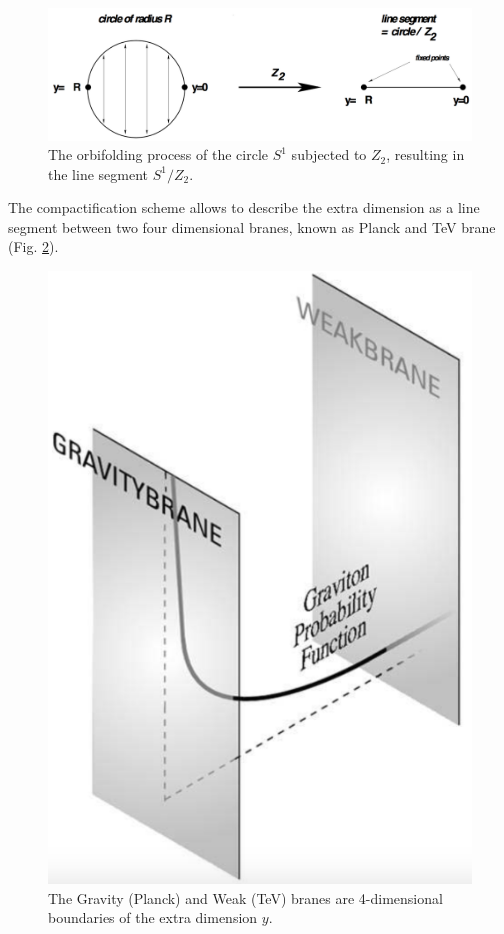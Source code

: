 \begin{figure}[htb!!]
\centering
\includegraphics[scale=0.25]{figures/theory/orbifold.png}
\caption[Orbifold process]{The orbifolding process of the circle $S^1$ subjected to $Z_2$, resulting in the line segment $S^1/Z_2$.}
\label{orbifold}
\end{figure}

The compactification scheme allows to describe the extra dimension as a line segment between two four dimensional branes, known as Planck and TeV brane (Fig. \ref{branes}).

\begin{figure}[htb!!]
\centering
\includegraphics[scale=0.33]{figures/theory/branes.png}
\caption[Gravity and weak branes]{The Gravity (Planck) and Weak (TeV) branes are 4-dimensional boundaries of the extra dimension $y$.}
\label{branes}
\end{figure}

